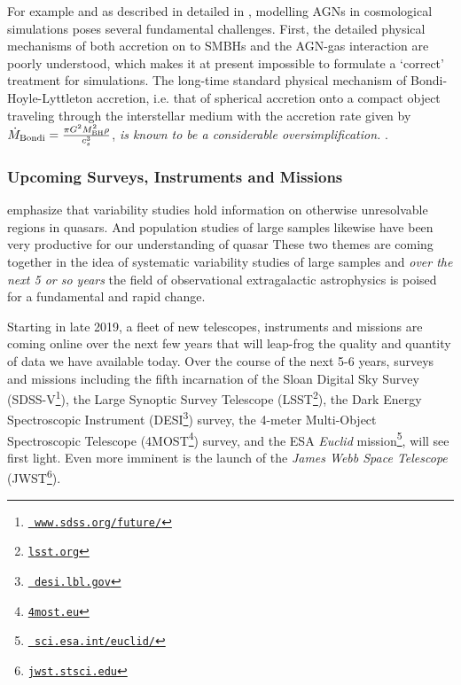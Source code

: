 \smallskip
\smallskip
\noindent
For example and as described in detailed in \citet{Weinberger2017},
modelling AGNs in cosmological simulations poses several fundamental
challenges. First, the detailed physical mechanisms of both accretion
on to SMBHs \citep{Hopkins_Quataert2010, Hopkins_Quataert2011,
Angles-Alcazar2013, Gaspari2013, Angles-Alcazar2015,
Angles-Alcazar2017, CurtisSijacki2015, CurtisSijacki2016a,
CurtisSijacki2016b, Emsellem2015, Rosas-Guevara2015} and the AGN-gas
interaction \citep{Huarte-Espinosa2011, Gaibler2012, Cielo2014,
Costa2014, Roos2015, Hopkins2016, Bieri2017} are poorly understood,
which makes it at present impossible to formulate a `correct'
treatment for simulations.  The long-time standard physical mechanism
of Bondi-Hoyle-Lyttleton accretion, i.e. that of spherical accretion
onto a compact object traveling through the interstellar medium
\citep{Hoyle_Lyttleton1939, Bondi_Hoyle1944, Bondi1952} with the
accretion rate given by $\dot {M}_{\rm Bondi} = \frac{\pi G^{2 }M_{\rm
BH}^{2} \rho }{c_{s}^{3}} $, {\it is known to be a considerable
oversimplification.} \citep[e.g.,][]{Edgar2004}.


\subsubsection{Upcoming Surveys, Instruments and Missions}
\smallskip
\smallskip
\noindent
\citep{Lawrence2016_ASPC} emphasize that variability studies hold
information on otherwise unresolvable regions in quasars. And
population studies of large samples likewise have been very productive
for our understanding of quasar These two themes are coming together
in the idea of systematic variability studies of large samples and
{\it over the next 5 or so years} the field of observational
extragalactic astrophysics is poised for a fundamental and rapid
change.


\smallskip
\smallskip
\noindent
Starting in late 2019, a fleet of new telescopes, instruments and missions are coming 
online over the next few years that will leap-frog the quality and
quantity of data we have available today. Over the course of the next
5-6 years, surveys and missions including the fifth incarnation of the
Sloan Digital Sky Survey
(SDSS-V\footnote{\href{www.sdss.org/future/}{{\tt
www.sdss.org/future/}}}), the Large Synoptic Survey Telescope
(LSST\footnote{\href{lsst.org}{{\tt lsst.org}}}), the Dark Energy
Spectroscopic Instrument (DESI\footnote{\href{desi.lbl.gov}{{\tt
desi.lbl.gov}}}) survey, the 4-meter Multi-Object Spectroscopic
Telescope (4MOST\footnote{\href{4most.eu}{{\tt 4most.eu}}}) survey,
and the ESA {\it Euclid}
mission\footnote{\href{sci.esa.int/euclid/}{{\tt
sci.esa.int/euclid/}}}, will see first light. Even more imminent is
the launch of the {\it James Webb Space Telescope}
(JWST\footnote{\href{jwst.stsci.edu}{{\tt jwst.stsci.edu}}}).




